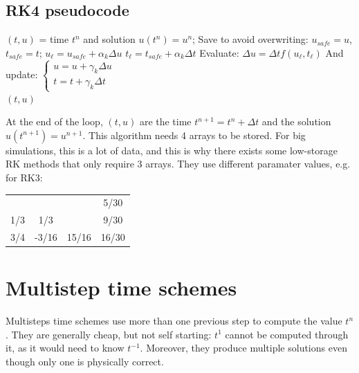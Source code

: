 \documentclass[12pt, openany]{report}
\theoremstyle{definition}
\begin{document}
\subsection{RK4 pseudocode}
\begin{algorithm}[H]
	\caption{RK4 pseudocode}
	\begin{algorithmic}[1]
		\State $(t,u)$ = time $t^n$ and solution $u(t^n)=u^n$;
		\State Save to avoid overwriting: $u_{safe} = u$, $t_{safe} = t$;
		\State $u_{\ell} = u_{safe} + \alpha_k \Delta u$
		\State $t_{\ell} = t_{safe} + \alpha_k \Delta t$
		\State Evaluate: $\Delta u = \Delta t f(u_{\ell}, t_\ell)$
		\State And update: $\begin{cases}
			u = u + \gamma_k \Delta u \\
			t = t + \gamma_k \Delta t
		\end{cases}$
		\EndFor\\
		\Return $(t,u)$
	\end{algorithmic}
\end{algorithm}
At the end of the loop, $(t,u)$ are the time $t^{n+1} = t^n + \Delta t$ and the solution $u(t^{n+1}) = u^{n+1}$. This algorithm needs 4 arrays to be stored. For big simulations, this is a lot of data, and this is why there exists some low-storage RK methods that only require 3 arrays. They use different paramater values, e.g. for RK3:\\
\begin{center}
	\begin{tabular}{|c|cc|c|}
		\hline 
		& & & 5/30\\
		1/3 & 1/3 & & 9/30\\
		3/4 & -3/16 & 15/16 & 16/30\\ \hline 
	\end{tabular}
\end{center}
\section{Multistep time schemes}
Multisteps time schemes use more than one previous step to compute the value $t^{n}$. They are generally cheap, but not self starting: $t^1$ cannot be computed through it, as it would need to know $t^{-1}$. Moreover, they produce multiple solutions even though only one is physically correct. 
\end{document}
